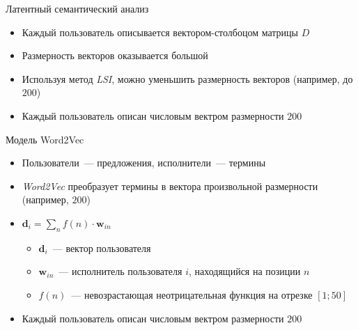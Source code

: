 \documentclass{beamer}
\begin{document}
\begin{frame}{Латентный семантический анализ}
  \begin{itemize}
      \item {Каждый пользователь описывается вектором-столбоцом матрицы $D$}
      \item {Размерность векторов оказывается большой}
      \item {Используя метод \textit{LSI}, можно уменьшить размерность векторов (например, до $200$)}
      \item {Каждый пользователь описан числовым вектром размерности $200$}
  \end{itemize}
\end{frame}

\begin{frame}{Модель Word2Vec}
  \begin{itemize}
      \item {Пользователи~--- предложения, исполнители~--- термины}
      \item {\textit{Word2Vec} преобразует термины в вектора произвольной размерности (например, $200$)}
      \item {$\bm{d}_{i} = \sum\limits_{n}{f(n) \cdot \bm{w}_{in}}$}
          \begin{itemize}
              \item {$\bm{d}_{i}$~--- вектор пользователя}
              \item {$\bm{w}_{in}$~--- исполнитель пользователя $i$, находящийся на позиции $n$}
              \item {$f(n)$~--- невозрастающая неотрицательная функция на отрезке $[1; 50]$}
          \end{itemize}
      \item {Каждый пользователь описан числовым вектром размерности $200$}
  \end{itemize}
\end{frame}
\end{document}
